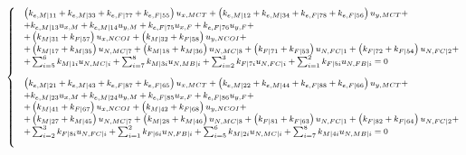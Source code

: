 \documentclass[review]{elsarticle}
\begin{document}
\begin{equation}\label{eq:syseqs02}
\footnotesize
\begin{cases}
&\left(k_{e,M|11}+k_{e,M|33}+k_{e,F|77}+k_{e,F|55}\right)u_{x,MCT}+\left(k_{e,M|12}+k_{e,M|34}+k_{e,F|78}+k_{e,F|56}\right)u_{y,MCT}+\\&+k_{e,M|13}u_{x,M}+k_{e,M|14}u_{y,M}+k_{e,F|75}u_{x,F}+k_{e,F|76}u_{y,F}+\\&+\left(k_{M|31}+k_{F|57}\right)u_{x,NCOI}+\left(k_{M|32}+k_{F|58}\right)u_{y,NCOI}+\\&+\left(k_{M|17}+k_{M|35}\right)u_{N,MC|7}+\left(k_{M|18}+k_{M|36}\right)u_{N,MC|8}+\left(k_{F|71}+k_{F|53}\right)u_{N,FC|1}+\left(k_{F|72}+k_{F|54}\right)u_{N,FC|2}+\\&+\sum_{i=5}^{6}k_{M|1i}u_{N,MC|i}+\sum_{i=7}^{8}k_{M|3i}u_{N,MB|i}+\sum_{i=2}^{3}k_{F|7i}u_{N,FC|i}+\sum_{i=1}^{2}k_{F|5i}u_{N,FB|i}=0\\[10pt]
&\left(k_{e,M|21}+k_{e,M|43}+k_{e,F|87}+k_{e,F|65}\right)u_{x,MCT}+\left(k_{e,M|22}+k_{e,M|44}+k_{e,F|88}+k_{e,F|66}\right)u_{y,MCT}+\\&+k_{e,M|23}u_{x,M}+k_{e,M|24}u_{y,M}+k_{e,F|85}u_{x,F}+k_{e,F|86}u_{y,F}+\\&+\left(k_{M|41}+k_{F|67}\right)u_{x,NCOI}+\left(k_{M|42}+k_{F|68}\right)u_{y,NCOI}+\\&+\left(k_{M|27}+k_{M|45}\right)u_{N,MC|7}+\left(k_{M|28}+k_{M|46}\right)u_{N,MC|8}+\left(k_{F|81}+k_{F|63}\right)u_{N,FC|1}+\left(k_{F|82}+k_{F|64}\right)u_{N,FC|2}+\\&+\sum_{i=2}^{3}k_{F|8i}u_{N,FC|i}+\sum_{i=1}^{2}k_{F|6i}u_{N,FB|i}+\sum_{i=5}^{6}k_{M|2i}u_{N,MC|i}+\sum_{i=7}^{8}k_{M|4i}u_{N,MB|i}=0\\[10pt]
\end{cases}
\end{equation}
\end{document}
